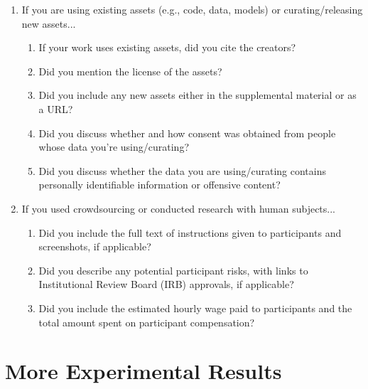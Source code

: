 \documentclass{article}
\newcommand{\0}{{\boldsymbol{0}}}
\newcommand{\6}{{\partial}}
\newcommand{\8}{{\infty}}
\newcommand{\4}{{\nabla}}
\begin{document}
\begin{enumerate}
\item If you are using existing assets (e.g., code, data, models) or curating/releasing new assets...
\begin{enumerate}
  \item If your work uses existing assets, did you cite the creators?
    \answerYes{}
  \item Did you mention the license of the assets?
    \answerNA{}
  \item Did you include any new assets either in the supplemental material or as a URL?
    \answerNo{}
  \item Did you discuss whether and how consent was obtained from people whose data you're using/curating?
    \answerNo{}
  \item Did you discuss whether the data you are using/curating contains personally identifiable information or offensive content?
    \answerNo{}
\end{enumerate}


\item If you used crowdsourcing or conducted research with human subjects...
\begin{enumerate}
  \item Did you include the full text of instructions given to participants and screenshots, if applicable?
    \answerNA{}
  \item Did you describe any potential participant risks, with links to Institutional Review Board (IRB) approvals, if applicable?
    \answerNA{}
  \item Did you include the estimated hourly wage paid to participants and the total amount spent on participant compensation?
    \answerNA{}
\end{enumerate}


\end{enumerate}


\clearpage

\appendix

\section{More Experimental Results}
\end{document}
